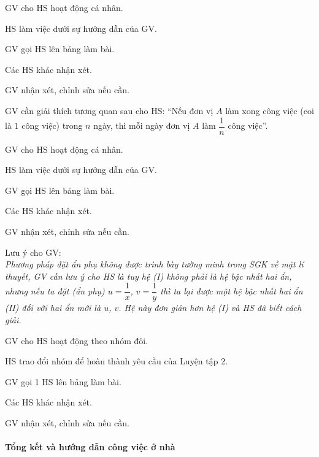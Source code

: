 \tochucthuchien

\begin{tcth}[luyentap=1]
	\buocmot
	\item GV cho HS hoạt động cá nhân.
	\buochai
	\item HS làm việc dưới sự hướng dẫn của GV.
	\item GV gọi HS lên bảng làm bài.
	\buocba
	\item Các HS khác nhận xét. 
	\buocbon
	\item GV nhận xét, chỉnh sửa nếu cần.
\end{tcth}

\begin{tcth}[vidu=2]
	\buocmot
	\item GV cần giải thích tương quan sau cho HS: ``Nếu đơn vị $A$ làm xong công việc (coi là $1$ công việc) trong $n$ ngày, thì mỗi ngày đơn vị $A$ làm $\dfrac{1}{n}$ công việc''.
	\item GV cho HS hoạt động cá nhân.
	\buochai
	\item HS làm việc dưới sự hướng dẫn của GV.
	\item GV gọi HS lên bảng làm bài.
	\buocba
	\item Các HS khác nhận xét. 
	\buocbon
	\item GV nhận xét, chỉnh sửa nếu cần.
	\item Lưu ý cho GV:\\
	\textit{Phương pháp đặt ẩn phụ không được trình bày tường minh trong SGK về mặt lí thuyết, GV cần lưu ý cho HS là tuy hệ (I) không phải là hệ bậc nhất hai ẩn, nhưng nếu ta đặt (ẩn phụ) $u=\dfrac{1}{x}$, $v=\dfrac{1}{y}$ thì ta lại được một hệ bậc nhất hai ẩn (II) đối với hai ẩn mới là $u$, $v$. Hệ này đơn giản hơn hệ (I) và HS đã biết cách giải.}
\end{tcth}

\begin{tcth}[luyentap=2]
	\buocmot
	\item GV cho HS hoạt động theo nhóm đôi.
	\buochai
	\item HS trao đổi nhóm để hoàn thành yêu cầu của Luyện tập 2.
	\item GV gọi 1 HS lên bảng làm bài.
	\buocba
	\item Các HS khác nhận xét. 
	\buocbon
	\item GV nhận xét, chỉnh sửa nếu cần.
\end{tcth}

\paragraph{Tổng kết và hướng dẫn công việc ở nhà}

